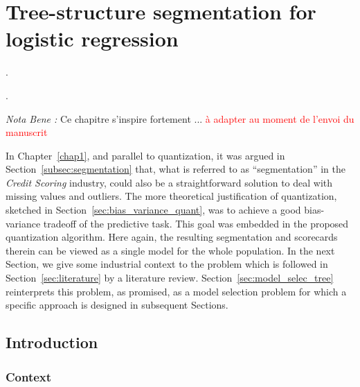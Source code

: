 \chapter{Tree-structure segmentation for logistic regression} \label{chap6}

\epigraph{.}{.}

\minitoc


\textit{Nota Bene :} Ce chapitre s'inspire fortement ... \textcolor{red}{à adapter au moment de l'envoi du manuscrit}

\bigskip


In Chapter~\ref{chap1}, and parallel to quantization, it was argued in Section~\ref{subsec:segmentation} that, what is referred to as ``segmentation'' in the \textit{Credit Scoring} industry, could also be a straightforward solution to deal with missing values and outliers. The more theoretical justification of quantization, sketched in Section~\ref{sec:bias_variance_quant}, was to achieve a good bias-variance tradeoff of the predictive task. This goal was embedded in the proposed quantization algorithm. Here again, the resulting segmentation and scorecards therein can be viewed as a single model for the whole population. In the next Section, we give some industrial context to the problem which is followed in Section~\ref{sec:literature} by a literature review. Section~\ref{sec:model_selec_tree} reinterprets this problem, as promised, as a model selection problem for which a specific approach is designed in subsequent Sections.


\section{Introduction}

\subsection{Context}

